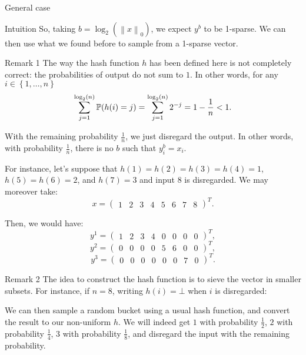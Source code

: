 \documentclass[a4paper]{article}
\begin{document}
\begin{parag}{General case}
\begin{subparag}{Intuition}
        So, taking $b = \log_2\left(\left\|x\right\|_0\right)$, we expect $y^b$ to be 1-sparse. We can then use what we found before to sample from a 1-sparse vector.
    \end{subparag}

    \begin{subparag}{Remark 1}
        The way the hash function $h$ has been defined here is not completely correct: the probabilities of output do not sum to $1$. In other words, for any $i \in \left\{1, \ldots, n\right\}$ 
        \[\sum_{j = 1}^{\log_2\left(n\right)} \prob\left(h\left(i\right) = j\right) = \sum_{j=1}^{\log_2\left(n\right)} 2^{-j} = 1 - \frac{1}{n} < 1.\]

        With the remaining probability $\frac{1}{n}$, we just disregard the output. In other words, with probability $\frac{1}{n}$, there is no $b$ such that $y_i^b = x_i$.

        For instance, let's suppose that $h\left(1\right) = h\left(2\right) = h\left(3\right) = h\left(4\right) = 1$, $h\left(5\right) = h\left(6\right) = 2$, and $h\left(7\right) = 3$ and input $8$ is disregarded. We may moreover take:
        \[x = \begin{pmatrix} 1 & 2 & 3 & 4 & 5 & 6 & 7 & 8 \end{pmatrix}^T.\]

        Then, we would have:
        \[y^1 = \begin{pmatrix} 1 & 2 & 3 & 4 & 0 & 0 & 0 & 0 \end{pmatrix}^T,\]
        \[y^2 = \begin{pmatrix} 0 & 0 & 0 & 0 & 5 & 6 & 0 & 0 \end{pmatrix}^T,\]
        \[y^3 = \begin{pmatrix} 0 & 0 & 0 & 0 & 0 & 0 & 7 & 0 \end{pmatrix}^T.\]
    \end{subparag}

    \begin{subparag}{Remark 2}
        The idea to construct the hash function is to sieve the vector in smaller subsets. For instance, if $n = 8$, writing $h\left(i\right) = \bot$ when $i$ is disregarded:

        We can then sample a random bucket using a usual hash function, and convert the result to our non-uniform $h$. We will indeed get $1$ with probability $\frac{1}{2}$, $2$ with probability $\frac{1}{4}$, $3$ with probability $\frac{1}{8}$, and disregard the input with the remaining probability.
    \end{subparag}


\end{parag}
\end{document}
